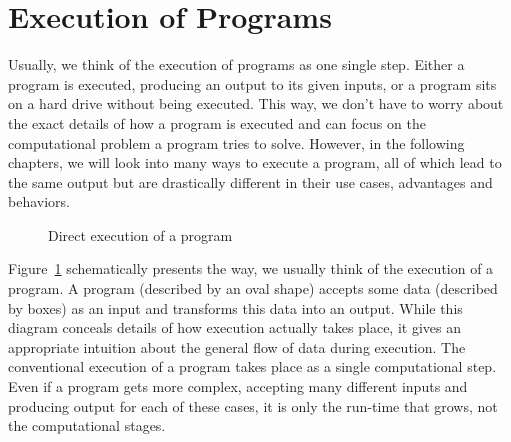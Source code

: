 
\section{Execution of Programs}\label{chap:programs}

Usually, we think of the execution of programs as one single step.
Either a program is executed, producing an output to its given inputs, or a program sits on a hard drive without being executed.
This way, we don't have to worry about the exact details of how a program is executed and can focus on the computational problem a program tries to solve.
However, in the following chapters, we will look into many ways to execute a program, all of which lead to the same output but are drastically different in their use cases, advantages and behaviors.

\begin{figure}[h]
  \centering
  \caption{Direct execution of a program}\label{fig:native-program}
\end{figure}


Figure~\ref{fig:native-program} schematically presents the way, we usually think of the execution of a program.
A program (described by an oval shape) accepts some data (described by boxes) as an input and transforms this data into an output.
While this diagram conceals details of how execution actually takes place, it gives an appropriate intuition about the general flow of data during execution.
The conventional execution of a program takes place as a single computational step.
Even if a program gets more complex, accepting many different inputs and producing output for each of these cases, it is only the run-time that grows, not the computational stages.


